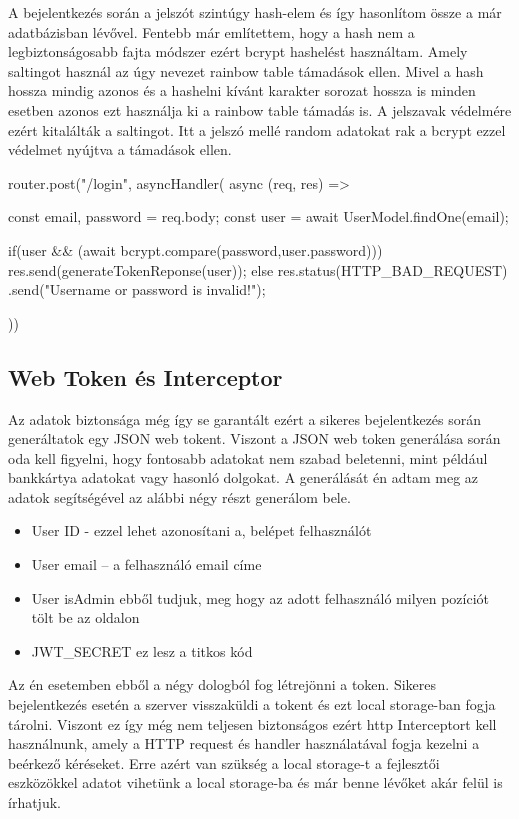 A bejelentkezés során a jelszót szintúgy hash-elem és így hasonlítom össze a már adatbázisban lévővel. Fentebb már említettem, hogy a hash nem a legbiztonságosabb fajta módszer ezért bcrypt hashelést használtam. Amely saltingot használ az úgy nevezet rainbow table támadások ellen. Mivel a hash hossza mindig azonos és a hashelni kívánt karakter sorozat hossza is minden esetben azonos ezt használja ki a rainbow table támadás is. A jelszavak védelmére ezért kitalálták a saltingot. Itt a jelszó mellé random adatokat rak a bcrypt ezzel védelmet nyújtva a támadások ellen.

\newpage

\begin{python}[caption={Bejelentkezés},captionpos=b]
  router.post("/login", asyncHandler(
  async (req, res) => {
    const {email, password} = req.body;
    const user = await UserModel.findOne({email});
  
     if(user && (await bcrypt.compare(password,user.password))) {
      res.send(generateTokenReponse(user));
     }
     else{
       res.status(HTTP_BAD_REQUEST)
       .send("Username or password is invalid!");
     }
  
  }
))
\end{python}

\subsection{Web Token és Interceptor}
Az adatok biztonsága még így se garantált ezért a sikeres bejelentkezés során generáltatok egy JSON web tokent. Viszont a JSON web token generálása során oda kell figyelni, hogy fontosabb adatokat nem szabad beletenni, mint például bankkártya adatokat vagy hasonló dolgokat.
A generálását én adtam meg az adatok segítségével az alábbi négy részt generálom bele.

\begin{itemize}
    \item User ID -  ezzel lehet azonosítani a, belépet felhasználót
    \item User email – a felhasználó email címe
    \item User isAdmin ebből tudjuk, meg hogy az adott felhasználó milyen pozíciót tölt be az oldalon
    \item JWT\_SECRET ez lesz a titkos kód
\end{itemize}

Az én esetemben ebből a négy dologból fog létrejönni a token. Sikeres bejelentkezés esetén a szerver visszaküldi a tokent és ezt local storage-ban fogja tárolni. Viszont ez így még nem teljesen biztonságos ezért http Interceptort kell használnunk, amely a HTTP request és handler használatával fogja kezelni a beérkező kéréseket. Erre azért van szükség a local storage-t a fejlesztői eszközökkel adatot vihetünk a local storage-ba és már benne lévőket akár felül is írhatjuk.

